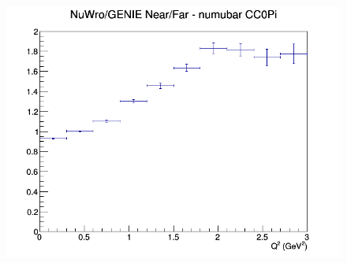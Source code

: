 \documentclass[12pt]{article}
\begin{document}
\begin{figure}[h]
\endminipage
{}
\includegraphics[width=\linewidth]{Q2/nominal/ratios/CC0Pi_NuWro_GENIE_numubar_NF_Q2.png}
\endminipage
\newline
\end{figure}
\clearpage
\end{document}
